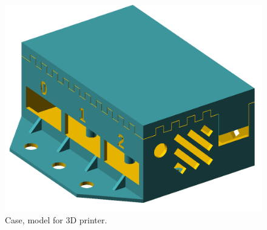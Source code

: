 \documentclass[10pt,article]{article}
\begin{document}
\begin{figure}[h]
 \centering
 \includegraphics[width = 15cm]{case.png}
\caption {Case, model for 3D printer.} \label{case}
\end{figure}




\end{document}
